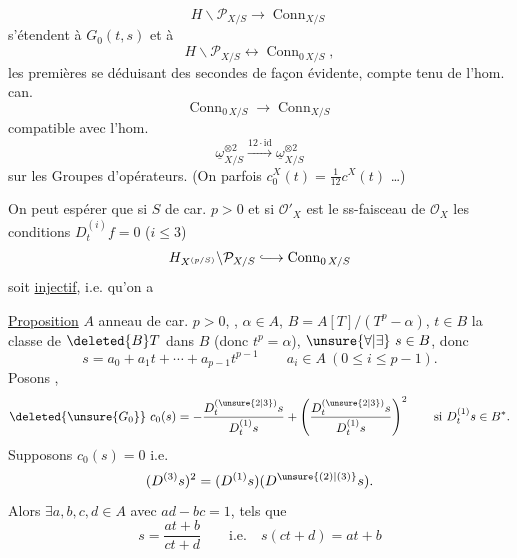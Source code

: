 \[
H\backslash\mathcal P_{X/S}\longrightarrow\operatorname{Conn}_{X/S}
\]
s'étendent à $G_0(t,s)$ et à
\[
H\backslash\mathcal P_{X/S}\longleftrightarrow\operatorname{Conn}_{0\,X/S},
\]
les premières se déduisant des secondes de façon évidente, compte tenu de l'hom. can.
\[
\operatorname{Conn}_{0\,X/S}\longrightarrow\operatorname{Conn}_{X/S}
\]
compatible avec l'hom.
\[
\underline\omega_{X/S}^{\otimes2}\xrightarrow{12\cdot\mathrm{id}}\underline\omega_{X/S}^{\otimes2}
\]
sur les Groupes d'opérateurs. (On   parfois $c_0^X(t)=\frac1{12}c^X(t)$ \ldots)

On peut espérer que si $S$ de car. $p>0$ et si $\mathcal O'_X$ est le ss-faisceau de $\mathcal O_X$   les conditions $D_t^{(i)}f=0$ ($i\le3$)
\[
H_{X^{(p/S)}}\backslash\mathcal P_{X/S}\lhook\joinrel\longrightarrow\operatorname{Conn}_{0\,X/S}
\]
soit \uline{injectif}, i.e. qu'on a

\uline{Proposition}  $A$ anneau de car. $p>0$, , $\alpha\in A$, $B=A[T]/(T^p-\alpha)$, $t\in B$ la classe de $\deleted{B}T$ dans $B$ (donc $t^p=\alpha$), $\unsure{\forall|\exists}\ s\in B$, donc
\[
s=a_0+a_1t+\cdots+a_{p-1}t^{p-1}\qquad a_i\in A\ (0\le i\le p-1).
\]
Posons
,
\[
\deleted{\unsure{G_0}}\ c_0(s)=-\frac{D_t^{(\unsure{2|3})}s}{D_t^{(1)}s}+\left(\frac{D_t^{(\unsure{2|3})}s}{D_t^{(1)}s}\right)^2\qquad\text{si }D_t^{(1)}s\in B^*.
\]
Supposons $c_0(s)=0$ i.e.
\[
(D^{(3)}s)^2=(D^{(1)}s)(D^{\unsure{(2)|(3)}}s).
\]
Alors $\exists a,b,c,d\in A$  avec $ad-bc=1$, tels que
\[
s=\frac{at+b}{ct+d}\qquad\text{i.e.}\quad s(ct+d)=at+b
\]
